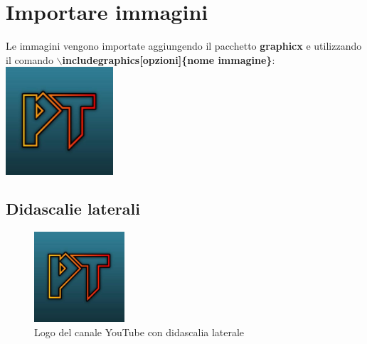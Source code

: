 \documentclass[a4paper,12pt,oneside]{book}
\theoremstyle{plain}
\begin{document}
	\chapter{Importare immagini}
	Le immagini vengono importate aggiungendo il pacchetto \textbf{graphicx} e utilizzando il comando \textbf{$\backslash$includegraphics[opzioni]\{nome immagine\}}:\\
	\includegraphics[width=0.3\textwidth]{logo}
	
	
	\section{Didascalie laterali}
	\begin{figure}
		\includegraphics[width=0.3\textwidth]{logo}
		\caption{Logo del canale YouTube con didascalia laterale}
		\label{fig:laterale}
	\end{figure}

	
	\newpage
\end{document}
